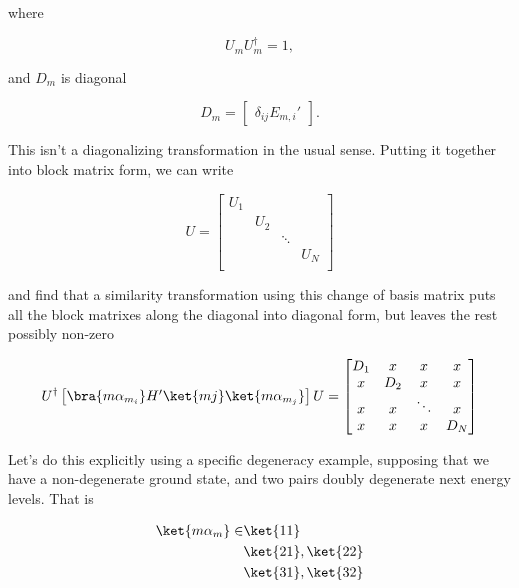 where

\begin{equation}\label{eqn:pertubationDegeneracy:190}
U_m U_m^\dagger = 1,
\end{equation}

and $D_m$ is diagonal

\begin{equation}\label{eqn:pertubationDegeneracy:210}
D_m = 
\begin{bmatrix}
\delta_{ij} E_{m,i}'
\end{bmatrix}.
\end{equation}

This isn't a diagonalizing transformation in the usual sense.  Putting it together into block matrix form, we can write

\begin{equation}\label{eqn:pertubationDegeneracy:230}
U = 
\begin{bmatrix}
U_1 &   	&  	 & \\
    & U_2 	&  	 & \\
    &     	& \ddots & \\
    &     	&        & U_N \\
\end{bmatrix}
\end{equation}

and find that a similarity transformation using this change of basis matrix puts all the block matrixes along the diagonal into diagonal form, but leaves the rest possibly non-zero

\begin{equation}\label{eqn:pertubationDegeneracy:250}
U^\dagger
\begin{bmatrix}
\bra{m \alpha_{m_i}} H' \ket{m j} \ket{m \alpha_{m_j}}
\end{bmatrix}
U
=
\begin{bmatrix}
D_1 & x 	& x	 & x \\
 x  & D_2 	& x	 & x \\
 x  & x   	& \ddots & x \\
 x  & x   	& x      & D_N \\
\end{bmatrix}
\end{equation}

Let's do this explicitly using a specific degeneracy example, supposing that we have a non-degenerate ground state, and two pairs doubly degenerate next energy levels.  That is

\begin{equation}\label{eqn:pertubationDegeneracy:270}
\begin{aligned}
\ket{m \alpha_m} \in 
&\ket{11} \\
&\ket{21}, \ket{22} \\
&\ket{31}, \ket{32} 
\end{aligned}
\end{equation}

